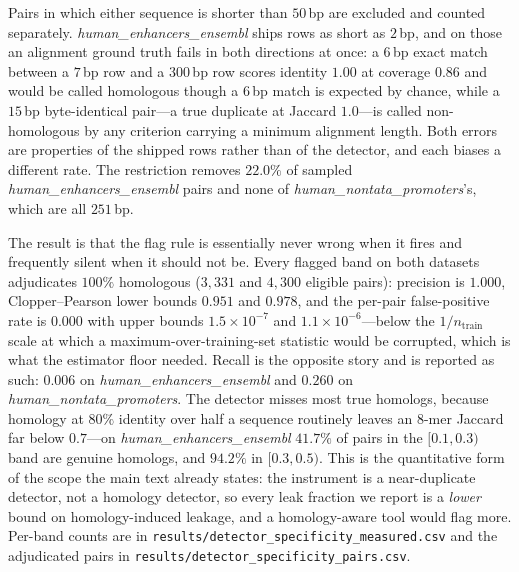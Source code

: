 \documentclass[11pt,a4paper]{article}
\begin{document}
Pairs in which either sequence is shorter than $50$\,bp are excluded and counted separately.
\textit{human\_enhancers\_ensembl} ships rows as short as $2$\,bp, and on those an alignment ground
truth fails in both directions at once: a $6$\,bp exact match between a $7$\,bp row and a $300$\,bp
row scores identity $1.00$ at coverage $0.86$ and would be called homologous though a $6$\,bp match
is expected by chance, while a $15$\,bp byte-identical pair---a true duplicate at Jaccard $1.0$---is
called non-homologous by any criterion carrying a minimum alignment length. Both errors are
properties of the shipped rows rather than of the detector, and each biases a different rate. The
restriction removes $22.0\%$ of sampled \textit{human\_enhancers\_ensembl} pairs and none of
\textit{human\_nontata\_promoters}'s, which are all $251$\,bp.

The result is that the flag rule is essentially never wrong when it fires and frequently silent when
it should not be. Every flagged band on both datasets adjudicates $100\%$ homologous
($3{,}331$ and $4{,}300$ eligible pairs): precision is $1.000$, Clopper--Pearson lower bounds
$0.951$ and $0.978$, and the per-pair false-positive rate is $0.000$ with upper bounds
$1.5\times10^{-7}$ and $1.1\times10^{-6}$---below the $1/n_{\text{train}}$ scale at which a
maximum-over-training-set statistic would be corrupted, which is what the estimator floor needed.
Recall is the opposite story and is reported as such: $0.006$ on \textit{human\_enhancers\_ensembl}
and $0.260$ on \textit{human\_nontata\_promoters}. The detector misses most true homologs, because
homology at $80\%$ identity over half a sequence routinely leaves an $8$-mer Jaccard far below
$0.7$---on \textit{human\_enhancers\_ensembl} $41.7\%$ of pairs in the $[0.1,0.3)$ band are genuine
homologs, and $94.2\%$ in $[0.3,0.5)$. This is the quantitative form of the scope the main text
already states: the instrument is a near-duplicate detector, not a homology detector, so every leak
fraction we report is a \emph{lower} bound on homology-induced leakage, and a homology-aware tool
would flag more. Per-band counts are in \texttt{results/detector\_specificity\_measured.csv} and the
adjudicated pairs in \texttt{results/detector\_specificity\_pairs.csv}.
\end{document}
